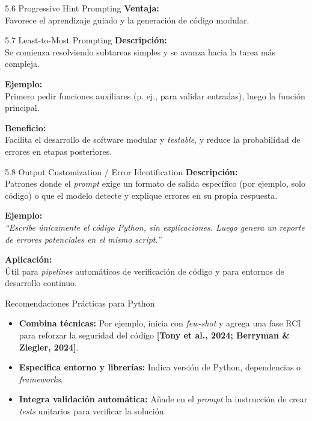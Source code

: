 \documentclass[xcolor=svgnames,t]{beamer}
\newcommand{\tightitem}{\itemsep4pt\parskip0pt\parsep0pt}
\begin{document}
{\begin{frame}{5.6 Progressive Hint Prompting}
\medskip
\textbf{Ventaja:}\\
Favorece el aprendizaje guiado y la generación de código modular.
\end{frame}


\begin{frame}{5.7 Least-to-Most Prompting}
\justifying
\textbf{Descripción:}\\
Se comienza resolviendo subtareas simples y se avanza hacia la tarea más compleja.

\medskip
\textbf{Ejemplo:}\\
Primero pedir funciones auxiliares (p. ej., para validar entradas), luego la función principal.

\medskip
\textbf{Beneficio:}\\
Facilita el desarrollo de software modular y \textit{testable}, y reduce la probabilidad de errores en etapas posteriores.
\end{frame}


\begin{frame}{5.8 Output Customization / Error Identification}
\justifying
\textbf{Descripción:}\\
Patrones donde el \textit{prompt} exige un formato de salida específico (por ejemplo, solo código) o que el modelo detecte y explique errores en su propia respuesta.

\medskip
\textbf{Ejemplo:}\\
\textit{“Escribe únicamente el código Python, sin explicaciones. Luego genera un reporte de errores potenciales en el mismo script.”}

\medskip
\textbf{Aplicación:}\\
Útil para \textit{pipelines} automáticos de verificación de código y para entornos de desarrollo continuo.
\end{frame}

\begin{frame}{Recomendaciones Prácticas para Python}
\justifying

\vspace{0.3em}
\begin{itemize}\tightitem
  \item \textbf{Combina técnicas:} Por ejemplo, inicia con \textit{few-shot} y agrega una fase RCI para reforzar la seguridad del código \textbf{[Tony et al., 2024; Berryman \& Ziegler, 2024]}.
  \item \textbf{Especifica entorno y librerías:} Indica versión de Python, dependencias o \textit{frameworks}.
  \item \textbf{Integra validación automática:} Añade en el \textit{prompt} la instrucción de crear \textit{tests} unitarios para verificar la solución.
\end{itemize}


\end{frame}}
\end{document}
